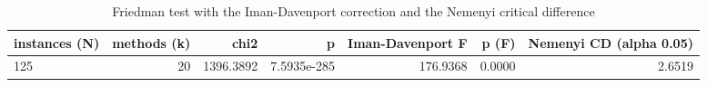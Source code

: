 \begin{table}[htbp]
\centering
\small
\caption{Friedman test with the Iman-Davenport correction and the Nemenyi critical difference}
\label{tab:E2_head_to_head_friedman_test}
\begin{tabular}{lrrrrrr}
\toprule
instances (N) & methods (k) & chi2 & p & Iman-Davenport F & p (F) & Nemenyi CD (alpha 0.05) \\
\midrule
125 & 20 & 1396.3892 & 7.5935e-285 & 176.9368 & 0.0000 & 2.6519 \\
\bottomrule
\end{tabular}
\end{table}
